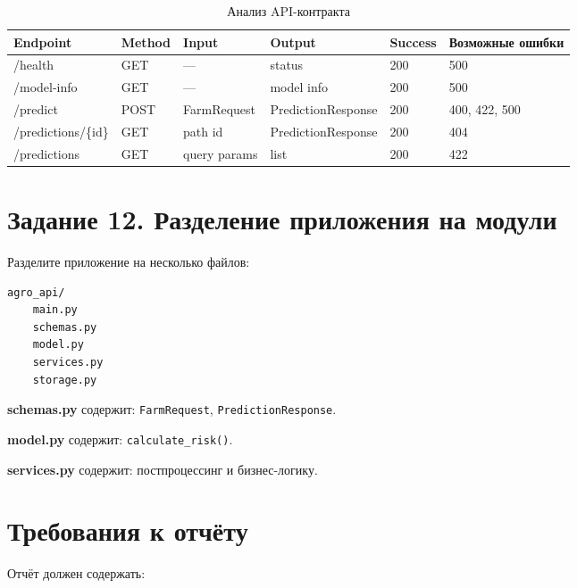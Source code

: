 \documentclass[12pt,a4paper]{article}
\begin{document}
\begin{table}[H]
\centering
\caption{Анализ API-контракта}
\label{tab:api_contract}
\begin{tabular}{|p{3cm}|p{1.5cm}|p{2.5cm}|p{3cm}|p{1.5cm}|p{2cm}|}
\hline
\textbf{Endpoint} & \textbf{Method} & \textbf{Input} & \textbf{Output} & \textbf{Success} & \textbf{Возможные ошибки} \\
\hline
/health & GET & --- & status & 200 & 500 \\
/model-info & GET & --- & model info & 200 & 500 \\
/predict & POST & FarmRequest & PredictionResponse & 200 & 400, 422, 500 \\
/predictions/\{id\} & GET & path id & PredictionResponse & 200 & 404 \\
/predictions & GET & query params & list & 200 & 422 \\
\hline
\end{tabular}
\end{table}

\section{Задание 12. Разделение приложения на модули}

Разделите приложение на несколько файлов:

\begin{lstlisting}[language=bash, caption={Структура проекта после рефакторинга}]
agro_api/
    main.py
    schemas.py
    model.py
    services.py
    storage.py
\end{lstlisting}

\textbf{schemas.py} содержит: \texttt{FarmRequest}, \texttt{PredictionResponse}.

\textbf{model.py} содержит: \texttt{calculate\_risk()}.

\textbf{services.py} содержит: постпроцессинг и бизнес-логику.

\section{Требования к отчёту}

Отчёт должен содержать:
\end{document}
